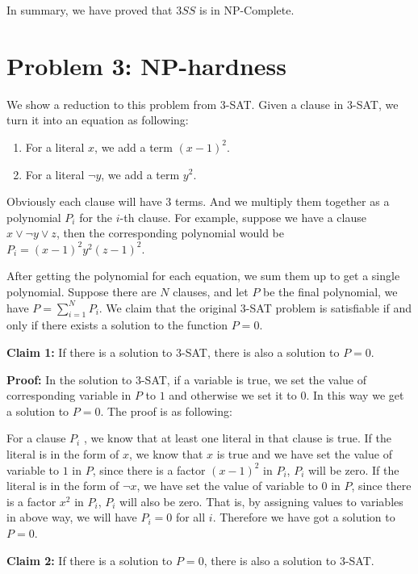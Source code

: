 \documentclass[paper=a4, fontsize=11pt]{scrartcl} %
\numberwithin{equation}{section} %
\numberwithin{figure}{section} %
\numberwithin{table}{section} %
\begin{document}
In summary, we have proved that $3SS$ is in NP-Complete. 

\section*{Problem 3: NP-hardness}
We show a reduction to this problem from $3$-SAT. Given a clause in $3$-SAT, we turn it into an
equation as following:
\begin{enumerate}
  \item For a literal $x$, we add a term $(x-1)^2$.
  \item For a literal $\lnot y$, we add a term $y^2$.
\end{enumerate}
Obviously each clause will have $3$ terms. And we multiply them together as a polynomial $P_i$ for
the $i$-th clause.
For example, suppose we have a clause $x \lor \lnot y \lor z$, then the corresponding polynomial
would be $P_i = (x-1)^2 y^2 (z-1)^2$.

After getting the polynomial for each equation, we sum them up to get a single polynomial. Suppose
there are $N$ clauses, and let $P$ be the final polynomial, we have $P = \sum_{i=1}^{N} P_i$. We
claim that the original $3$-SAT problem is satisfiable if and only if there exists a solution to the
function $P = 0$.

\textbf{Claim 1:} If there is a solution to $3$-SAT, there is also a solution to $P = 0$.

\textbf{Proof:}
In the solution to $3$-SAT, if a variable is true, we set the value of corresponding variable in $P$
to $1$ and otherwise we set it to $0$. In this way we get a solution to $P = 0$. The proof is as
following:

For a clause $P_i$ , we know that at least one literal in that clause is true. If
the literal is in the form of $x$, we know that $x$ is true and we have set the value of variable to
$1$ in $P$,  since there is a factor
$(x-1)^2$ in $P_i$, $P_i$ will be zero. If the literal is in the form of $\lnot x$, we have set the
value of variable to $0$ in $P$, since there is a factor $x^2$ in $P_i$, $P_i$ will also be zero. That
is, by assigning values to variables in above way, we will have $P_i = 0$ for all $i$. Therefore we
have got a solution to $P= 0$.

\textbf{Claim 2:} If there is a solution to $P=0$, there is also a solution to $3$-SAT.
\end{document}
